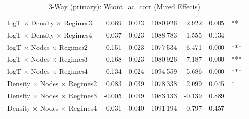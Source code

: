 \begin{table}[ht]
\begin{tabular}{lrrrrrl}
  logT × Density × Regimes3 & -0.069 & 0.023 & 1080.926 & -2.922 & 0.005 & ** \\ 
  logT × Density × Regimes4 & -0.037 & 0.023 & 1088.783 & -1.555 & 0.134 &  \\ 
  logT × Nodes × Regimes2 & -0.151 & 0.023 & 1077.534 & -6.471 & 0.000 & *** \\ 
  logT × Nodes × Regimes3 & -0.168 & 0.023 & 1080.926 & -7.187 & 0.000 & *** \\ 
  logT × Nodes × Regimes4 & -0.134 & 0.024 & 1094.559 & -5.686 & 0.000 & *** \\ 
  Density × Nodes × Regimes2 & 0.083 & 0.039 & 1078.338 & 2.099 & 0.045 & * \\ 
  Density × Nodes × Regimes3 & -0.005 & 0.039 & 1083.133 & -0.139 & 0.889 &  \\ 
  Density × Nodes × Regimes4 & -0.031 & 0.040 & 1091.194 & -0.797 & 0.457 &  \\ 
   \hline
\end{tabular}
\caption{3-Way (primary): Wcont_ac_corr (Mixed Effects)} 
\end{table}
